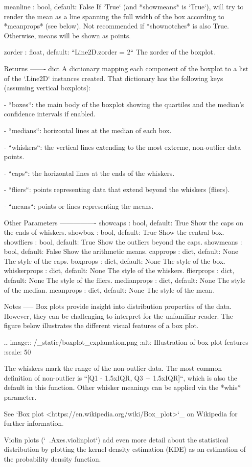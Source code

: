 \begin{DoxyVerb}
meanline : bool, default: False
    If `True` (and *showmeans* is `True`), will try to render the
    mean as a line spanning the full width of the box according to
    *meanprops* (see below).  Not recommended if *shownotches* is also
    True.  Otherwise, means will be shown as points.

zorder : float, default: ``Line2D.zorder = 2``
    The zorder of the boxplot.

Returns
-------
dict
  A dictionary mapping each component of the boxplot to a list
  of the `.Line2D` instances created. That dictionary has the
  following keys (assuming vertical boxplots):

  - ``boxes``: the main body of the boxplot showing the
    quartiles and the median's confidence intervals if
    enabled.

  - ``medians``: horizontal lines at the median of each box.

  - ``whiskers``: the vertical lines extending to the most
    extreme, non-outlier data points.

  - ``caps``: the horizontal lines at the ends of the
    whiskers.

  - ``fliers``: points representing data that extend beyond
    the whiskers (fliers).

  - ``means``: points or lines representing the means.

Other Parameters
----------------
showcaps : bool, default: True
    Show the caps on the ends of whiskers.
showbox : bool, default: True
    Show the central box.
showfliers : bool, default: True
    Show the outliers beyond the caps.
showmeans : bool, default: False
    Show the arithmetic means.
capprops : dict, default: None
    The style of the caps.
boxprops : dict, default: None
    The style of the box.
whiskerprops : dict, default: None
    The style of the whiskers.
flierprops : dict, default: None
    The style of the fliers.
medianprops : dict, default: None
    The style of the median.
meanprops : dict, default: None
    The style of the mean.

Notes
-----
Box plots provide insight into distribution properties of the data.
However, they can be challenging to interpret for the unfamiliar
reader. The figure below illustrates the different visual features of
a box plot.

.. image:: /_static/boxplot_explanation.png
   :alt: Illustration of box plot features
   :scale: 50 %

The whiskers mark the range of the non-outlier data. The most common
definition of non-outlier is ``[Q1 - 1.5xIQR, Q3 + 1.5xIQR]``, which
is also the default in this function. Other whisker meanings can be
applied via the *whis* parameter.

See `Box plot <https://en.wikipedia.org/wiki/Box_plot>`_ on Wikipedia
for further information.

Violin plots (`~.Axes.violinplot`) add even more detail about the
statistical distribution by plotting the kernel density estimation
(KDE) as an estimation of the probability density function.
\end{DoxyVerb}
